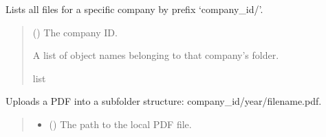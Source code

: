\documentclass[letterpaper,10pt,english]{sphinxmanual}
\begin{document}
\begin{fulllineitems}

\begin{fulllineitems}
\label{\detokenize{src.database:src.database.minio.MinioFileSystem.list_files_by_company}}
\pysigstartsignatures
\pysiglinewithargsret
{}
{}
{}
\pysigstopsignatures
\sphinxAtStartPar
Lists all files for a specific company by prefix ‘company\_id/’.
\begin{quote}\begin{description}
\sphinxAtStartPar
{} () \textendash{} The company ID.

\sphinxAtStartPar
A list of object names belonging to that company’s folder.

\sphinxAtStartPar
list

\end{description}\end{quote}

\end{fulllineitems}


\begin{fulllineitems}
\label{\detokenize{src.database:src.database.minio.MinioFileSystem.upload_pdf}}
\pysigstartsignatures
\pysiglinewithargsret
{}
{\sphinxparamcomma {}\sphinxparamcomma {}}
{}
\pysigstopsignatures
\sphinxAtStartPar
Uploads a PDF into a subfolder structure: company\_id/year/filename.pdf.
\begin{quote}\begin{description}
\begin{itemize}
\item {} 
\sphinxAtStartPar
{} () \textendash{} The path to the local PDF file.


\end{itemize}
\end{description}
\end{quote}
\end{fulllineitems}
\end{fulllineitems}
\end{document}
